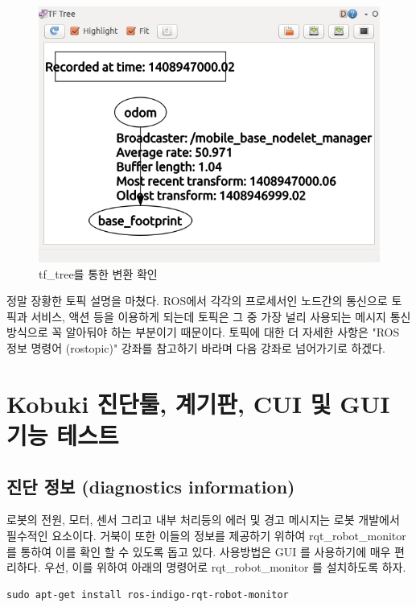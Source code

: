 \begin{figure}[h]
\centering\includegraphics[width=0.8\columnwidth]{pictures/chapter10/rqt_tf_tree_kobuki.png}
\caption{tf\_tree를 통한 변환 확인}
\end{figure}

정말 장황한 토픽 설명을 마쳤다. ROS에서 각각의 프로세서인 노드간의 통신으로 토픽과 서비스, 액션 등을 이용하게 되는데 토픽은 그 중 가장 널리 사용되는 메시지 통신 방식으로 꼭 알아둬야 하는 부분이기 때문이다. 토픽에 대한 더 자세한 사항은 "ROS 정보 명령어 (rostopic)" 강좌를 참고하기 바라며 다음 강좌로 넘어가기로 하겠다.

\section{Kobuki 진단툴, 계기판, CUI 및 GUI 기능 테스트}

\subsection{진단 정보 (diagnostics information)}

로봇의 전원, 모터, 센서 그리고 내부 처리등의 에러 및 경고 메시지는 로봇 개발에서 필수적인 요소이다. 거북이 또한 이들의 정보를 제공하기 위하여  rqt\_robot\_monitor 를 통하여 이를 확인 할 수 있도록 돕고 있다. 사용방법은 GUI 를 사용하기에 매우 편리하다. 우선, 이를 위하여 아래의 명령어로 rqt\_robot\_monitor 를 설치하도록 하자.

\vspace{\baselineskip}
\begin{lstlisting}[language=ROS]
sudo apt-get install ros-indigo-rqt-robot-monitor
\end{lstlisting}


